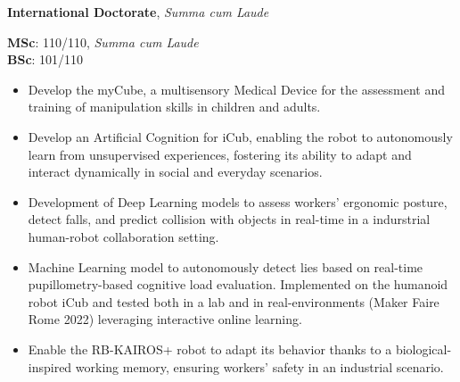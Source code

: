 

  \textbf{International Doctorate}, \textit{Summa cum Laude}   
  
  
    \divider
    
  \textbf{MSc}: 110/110, \textit{Summa cum Laude}\\\textbf{BSc}: 101/110   
  
  

    \begin{itemize}
    \item Develop the myCube, a multisensory Medical Device for the assessment and training of manipulation skills in children and adults.
    \end{itemize}
    \smallskip
  
    \begin{itemize}
    \item Develop an Artificial Cognition for iCub, enabling the robot to autonomously learn from unsupervised experiences, fostering its ability to adapt and interact dynamically in social and everyday scenarios.
    \end{itemize}
    \smallskip
  
    \begin{itemize}
    \item Development of Deep Learning models to assess workers' ergonomic posture, detect falls, and predict collision with objects in real-time in a indurstrial human-robot collaboration setting.
    \end{itemize}
    \smallskip
  
    \begin{itemize}
    \item Machine Learning model to autonomously detect lies based on real-time pupillometry-based cognitive load evaluation. Implemented on the humanoid robot iCub and tested both in a lab and in real-environments (Maker Faire Rome 2022) leveraging interactive online learning.
    \end{itemize}
    \smallskip
  
    \begin{itemize}
    \item Enable the RB-KAIROS+ robot to adapt its behavior thanks to a biological-inspired working memory, ensuring workers' safety in an industrial scenario.
    \end{itemize}
    \smallskip
  
  